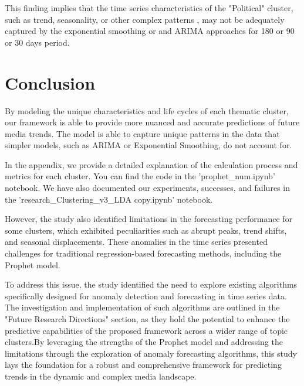 






This finding implies that the time series characteristics of the "Political" cluster, such as trend, seasonality, or other complex patterns , may not be adequately captured by the exponential smoothing or and ARIMA approaches for 180 or 90 or 30 days period.


\section{Conclusion}
By modeling the unique characteristics and life cycles of each thematic cluster, our framework is able to provide more nuanced and accurate predictions of future media trends. The model is able to capture unique patterns in the data that simpler models, such as ARIMA or Exponential Smoothing, do not account for.

In the appendix, we provide a detailed explanation of the calculation process and metrics for each cluster. You can find the code in the 'prophet\_num.ipynb' notebook. We have also documented our experiments, successes, and failures in the 'research\_Clustering\_v3\_LDA copy.ipynb' notebook.

However, the study also identified limitations in the forecasting performance for some clusters, which exhibited peculiarities such as abrupt peaks, trend shifts, and seasonal displacements. These anomalies in the time series presented challenges for traditional regression-based forecasting methods, including the Prophet model.

To address this issue, the study identified the need to explore existing algorithms specifically designed for anomaly detection and forecasting in time series data. The investigation and implementation of such algorithms are outlined in the "Future Research Directions" section, as they hold the potential to enhance the predictive capabilities of the proposed framework across a wider range of topic clusters.By leveraging the strengths of the Prophet model and addressing the limitations through the exploration of anomaly forecasting algorithms, this study lays the foundation for a robust and comprehensive framework for predicting trends in the dynamic and complex media landscape.

